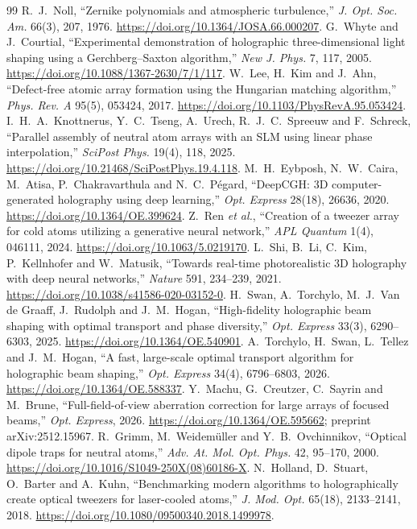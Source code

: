 \begin{thebibliography}{99}
 R.~J.~Noll, ``Zernike polynomials and atmospheric turbulence,'' \emph{J. Opt. Soc. Am.} 66(3), 207, 1976. \url{https://doi.org/10.1364/JOSA.66.000207}.
 G.~Whyte and J.~Courtial, ``Experimental demonstration of holographic three-dimensional light shaping using a Gerchberg--Saxton algorithm,'' \emph{New J. Phys.} 7, 117, 2005. \url{https://doi.org/10.1088/1367-2630/7/1/117}.
 W.~Lee, H.~Kim and J.~Ahn, ``Defect-free atomic array formation using the Hungarian matching algorithm,'' \emph{Phys. Rev. A} 95(5), 053424, 2017. \url{https://doi.org/10.1103/PhysRevA.95.053424}.
 I.~H.~A.~Knottnerus, Y.~C.~Tseng, A.~Urech, R.~J.~C.~Spreeuw and F.~Schreck, ``Parallel assembly of neutral atom arrays with an SLM using linear phase interpolation,'' \emph{SciPost Phys.} 19(4), 118, 2025. \url{https://doi.org/10.21468/SciPostPhys.19.4.118}.
 M.~H.~Eybposh, N.~W.~Caira, M.~Atisa, P.~Chakravarthula and N.~C.~P\'egard, ``DeepCGH: 3D computer-generated holography using deep learning,'' \emph{Opt. Express} 28(18), 26636, 2020. \url{https://doi.org/10.1364/OE.399624}.
 Z.~Ren \emph{et al.}, ``Creation of a tweezer array for cold atoms utilizing a generative neural network,'' \emph{APL Quantum} 1(4), 046111, 2024. \url{https://doi.org/10.1063/5.0219170}.
 L.~Shi, B.~Li, C.~Kim, P.~Kellnhofer and W.~Matusik, ``Towards real-time photorealistic 3D holography with deep neural networks,'' \emph{Nature} 591, 234--239, 2021. \url{https://doi.org/10.1038/s41586-020-03152-0}.
 H.~Swan, A.~Torchylo, M.~J.~Van de Graaff, J.~Rudolph and J.~M.~Hogan, ``High-fidelity holographic beam shaping with optimal transport and phase diversity,'' \emph{Opt. Express} 33(3), 6290--6303, 2025. \url{https://doi.org/10.1364/OE.540901}.
 A.~Torchylo, H.~Swan, L.~Tellez and J.~M.~Hogan, ``A fast, large-scale optimal transport algorithm for holographic beam shaping,'' \emph{Opt. Express} 34(4), 6796--6803, 2026. \url{https://doi.org/10.1364/OE.588337}.
 Y.~Machu, G.~Creutzer, C.~Sayrin and M.~Brune, ``Full-field-of-view aberration correction for large arrays of focused beams,'' \emph{Opt. Express}, 2026. \url{https://doi.org/10.1364/OE.595662}; preprint arXiv:2512.15967.
 R.~Grimm, M.~Weidem\"uller and Y.~B.~Ovchinnikov, ``Optical dipole traps for neutral atoms,'' \emph{Adv. At. Mol. Opt. Phys.} 42, 95--170, 2000. \url{https://doi.org/10.1016/S1049-250X(08)60186-X}.
 N.~Holland, D.~Stuart, O.~Barter and A.~Kuhn, ``Benchmarking modern algorithms to holographically create optical tweezers for laser-cooled atoms,'' \emph{J. Mod. Opt.} 65(18), 2133--2141, 2018. \url{https://doi.org/10.1080/09500340.2018.1499978}.

\end{thebibliography}
